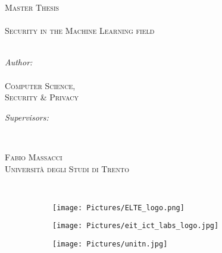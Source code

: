 \begin{titlepage}
	\begin{center}
		
		
		\textsc{\Large Master Thesis}\\[0.3cm] %
		
		\HRule \\[0.4cm] %
	{\huge \vspace{0.5cm} \textsc{Security in the Machine Learning field  \\[0.4cm]}}
		\HRule \\[1.5cm] %
		
	\begin{minipage}{0.43\textwidth}
		\begin{flushleft} \large	
			\emph{Author:}\\
			\textsc{\authornames\\ \small Computer Science, \\\hspace{0cm}Security \& Privacy  \\\hspace{0cm}} %
		\end{flushleft}
	\end{minipage}
	\begin{minipage}{0.56\textwidth}
		\begin{flushright} \large
			\emph{Supervisors:} \\
			\textsc{\supname} %
		\end{flushright}
	\end{minipage}\\[1cm]
	\begin{minipage}{0.37\textwidth}
		\begin{flushleft} \large	
			
		\end{flushleft}
	\end{minipage}
	\begin{minipage}{0.62\textwidth}
		\begin{flushright} \large
			
			\textsc{Fabio \textsc{Massacci} \\Università degli Studi di Trento\\[0.1cm] } %
		\end{flushright}
	\end{minipage}
		\\[2cm]
		\begin{figure}[h!]
			\begin{subfigure}{0.32\textwidth}
				\centering
				\texttt{[image: Pictures/ELTE\_logo.png]}
			\end{subfigure}
			\begin{subfigure}{0.32\textwidth}
				\centering
				\texttt{[image: Pictures/eit\_ict\_labs\_logo.jpg]}
			\end{subfigure}
			\begin{subfigure}{0.32\textwidth}
				\centering			\texttt{[image: Pictures/unitn.jpg]}
			\end{subfigure}%
		\end{figure}
		\textbf{} 
		

\end{center}
\end{titlepage}
